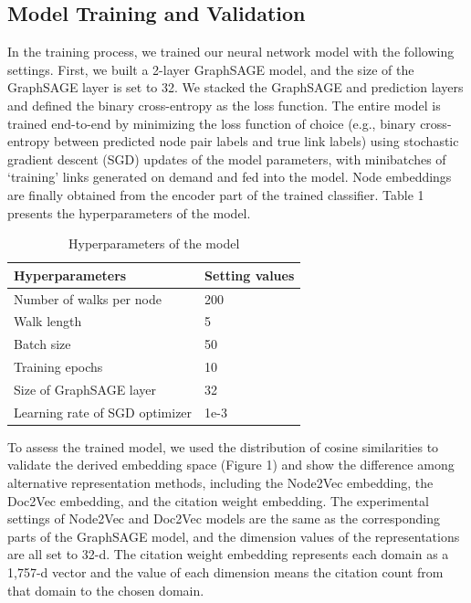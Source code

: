 \documentclass{article}
\begin{document}
\subsection{Model Training and Validation}

In the training process, we trained our neural network model with the following settings. First, we built a 2-layer GraphSAGE model, and the size of the GraphSAGE layer is set to 32. We stacked the GraphSAGE and prediction layers and defined the binary cross-entropy as the loss function. The entire model is trained end-to-end by minimizing the loss function of choice (e.g., binary cross-entropy between predicted node pair labels and true link labels) using stochastic gradient descent (SGD) updates of the model parameters, with minibatches of ‘training’ links generated on demand and fed into the model. Node embeddings are finally obtained from the encoder part of the trained classifier. Table 1 presents the hyperparameters of the model.

\begin{center}
\begin{table}[!htb]
	\caption{Hyperparameters of the model}
	\centering
	\begin{tabular}{p{6cm}<{\centering}p{4cm}<{\centering}}
		\toprule
		\textbf{Hyperparameters}    & \textbf{Setting values}\\
		
		\midrule

            Number of walks per node & 200 \\
            Walk length & 5 \\
            Batch size & 50 \\
            Training epochs & 10 \\
            Size of GraphSAGE layer & 32 \\
            Learning rate of SGD optimizer & 1e-3\\
		
		\bottomrule
	\end{tabular}
	\label{tab:table1}
\end{table}
\end{center}

To assess the trained model, we used the distribution of cosine similarities to validate the derived embedding space (Figure 1) and show the difference among alternative representation methods, including the Node2Vec embedding, the Doc2Vec embedding, and the citation weight embedding. The experimental settings of Node2Vec and Doc2Vec models are the same as the corresponding parts of the GraphSAGE model, and the dimension values of the representations are all set to 32-d. The citation weight embedding represents each domain as a 1,757-d vector and the value of each dimension means the citation count from that domain to the chosen domain.
\end{document}
